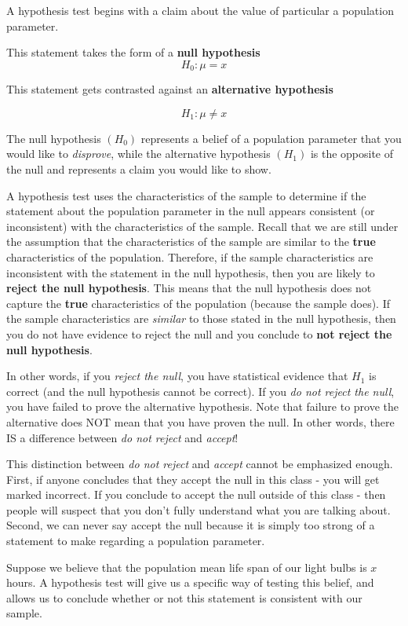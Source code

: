 \documentclass[
]{book}
\begin{document}
A hypothesis test begins with a claim about the value of particular a population parameter.

This statement takes the form of a \textbf{null hypothesis}
\[H_0 : \mu = x\]

This statement gets contrasted against an \textbf{alternative hypothesis}

\[H_1 : \mu \neq x\]

The null hypothesis \((H_0)\) represents a belief of a population parameter that you would like to \emph{disprove}, while the alternative hypothesis \((H_1)\) is the opposite of the null and represents a claim you would like to show.

A hypothesis test uses the characteristics of the sample to determine if the statement about the population parameter in the null appears consistent (or inconsistent) with the characteristics of the sample. Recall that we are still under the assumption that the characteristics of the sample are similar to the \textbf{true} characteristics of the population. Therefore, if the sample characteristics are inconsistent with the statement in the null hypothesis, then you are likely to \textbf{reject the null hypothesis}. This means that the null hypothesis does not capture the \textbf{true} characteristics of the population (because the sample does). If the sample characteristics are \emph{similar} to those stated in the null hypothesis, then you do not have evidence to reject the null and you conclude to \textbf{not reject the null hypothesis}.

In other words, if you \emph{reject the null}, you have statistical evidence that \(H_1\) is correct (and the null hypothesis cannot be correct). If you \emph{do not reject the null}, you have failed to prove the alternative hypothesis. Note that failure to prove the alternative does NOT mean that you have proven the null. In other words, there IS a difference between \emph{do not reject} and \emph{accept}!

This distinction between \emph{do not reject} and \emph{accept} cannot be emphasized enough. First, if anyone concludes that they accept the null in this class - you will get marked incorrect. If you conclude to accept the null outside of this class - then people will suspect that you don't fully understand what you are talking about. Second, we can never say accept the null because it is simply too strong of a statement to make regarding a population parameter.

Suppose we believe that the population mean life span of our light bulbs is \(x\) hours. A hypothesis test will give us a specific way of testing this belief, and allows us to conclude whether or not this statement is consistent with our sample.
\end{document}
